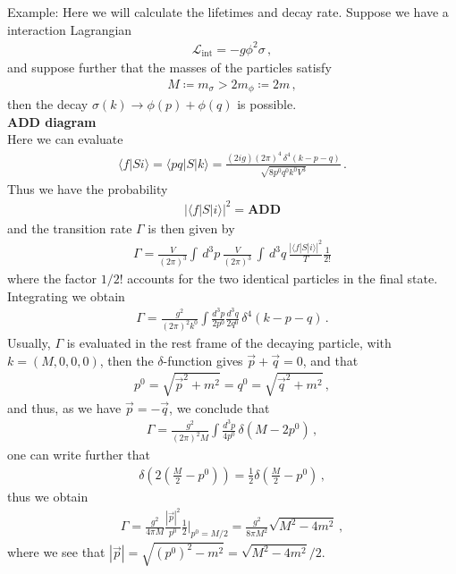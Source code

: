 \documentclass[11pt, onesided]{book}
\theoremstyle{break}
\theoremstyle{break}
\newcommand{\example}{\color{green}Example: \color{black}}
\begin{document}
\example Here we will calculate the lifetimes and decay rate. Suppose we have a interaction Lagrangian
\begin{align*}
\mathcal{L}_{\text{int}} = -g \phi^2 \sigma\,,
\end{align*}
and suppose further that the masses of the particles satisfy
\begin{align*}
M \coloneqq m_\sigma > 2m_{\phi} \coloneqq 2m\,,
\end{align*}
then the decay $\sigma(k) \to \phi(p) + \phi(q)$ is possible. \\
\textbf{ADD diagram}\\
Here we can evaluate
\begin{align*}
\langle f|Si\rangle = \langle pq|S|k\rangle = \frac{(2ig)(2\pi)^4 \, \delta^4( k-p-q)}{\sqrt{8 p^0q^0k^0V^3}}\,.
\end{align*}
Thus we have the probability
\begin{align*}
|\langle f|S|i\rangle|^2 = \textbf{ADD}
\end{align*}
and the transition rate $\Gamma$ is then given by
\begin{align*}
\Gamma = \frac{V}{(2\pi)^3}\int \, d^3p \, \frac{V}{(2\pi)^3}\, \int \, d^3q \, \frac{|\langle f|S|i\rangle|^2}{T} \frac{1}{2!}
\end{align*}
where the factor $1/2!$ accounts for the two identical particles in the final state. Integrating we obtain
\begin{align*}
\Gamma = \frac{g^2}{(2\pi)^2k^0}\int \frac{d^3p}{2p^0}\frac{d^3q}{2q^0}\, \delta^4(k-p-q)\,.
\end{align*}
Usually, $\Gamma$ is evaluated in the rest frame of the decaying particle, with $k = (M,0,0,0)$, then the $\delta$-function gives $\vec{p}+\vec{q} = 0$, and that
\begin{align*}
p^0 = \sqrt{\vec{p}^2 + m^2} = q^0 = \sqrt{\vec{q}^2 +m^2}\,,
\end{align*}
and thus, as we have $\vec{p} = -\vec{q}$, we conclude that 
\begin{align*}
\Gamma = \frac{g^2}{(2\pi)^2 M}\int \frac{d^3 p}{4p^0}\,\delta(M - 2p^0)\,,
\end{align*}
one can write further that
\begin{align*}
\delta\left( 2\left( \frac{M}{2} - p^0 \right)\right) = \frac{1}{2}\delta\left( \frac{M}{2} - p^0\right)\,,
\end{align*}
thus we obtain
\begin{align*}
\Gamma = \frac{g^2}{4\pi M}\frac{|\vec{p}|^2}{p^0}\frac{1}{2}|_{p^0 = M/2} = \frac{g^2}{8\pi M^2}\sqrt{M^2 - 4m^2}\,,
\end{align*}
where we see that $|\vec{p}| = \sqrt{(p^0)^2 - m^2} = \sqrt{M^2 - 4m^2}/2$. \\
\end{document}
